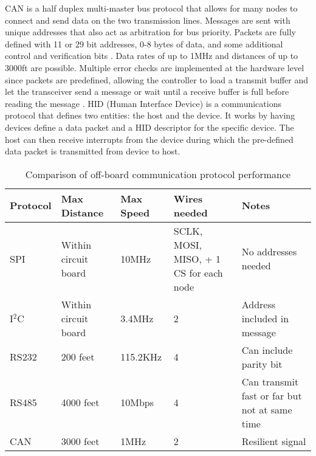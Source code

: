 \newline
CAN is a half duplex multi-master bus protocol that allows for many nodes to connect and send data on the two transmission lines. Messages are sent with unique addresses that also act as arbitration for bus priority. Packets are fully defined with 11 or 29 bit addresses, 0-8 bytes of data, and some additional control and verification bits \cite{CAN_Guide,CAN_Requirements}. Data rates of up to 1MHz and distances of up to 3000ft are possible. Multiple error checks are implemented at the hardware level since packets are predefined, allowing the controller to load a transmit buffer and let the transceiver send a message or wait until a receive buffer is full before reading the message \cite{CANvSPI}. 
\newline
HID (Human Interface Device) is a communications protocol that defines two entities: the host and the device.  It works by having devices define a data packet and a HID descriptor for the specific device. The host can then receive interrupts from the device during which the pre-defined data packet is transmitted from device to host.  

\begin{table}[H]
	\begin{center}
		\begin{tabular} {| l | l | p{2cm} | p{2.5cm} | p{2.5cm} |}
			\hline
			Protocol & Max Distance & Max Speed & Wires needed & Notes \\ \hline
			SPI & Within circuit board & 10MHz & SCLK, MOSI, MISO, + 1 CS for each node & No addresses needed
			\\ \hline
			I$^2$C & Within circuit board & 3.4MHz & 2 & Address included in message
			\\ \hline
			RS232 & 200 feet & 115.2KHz & 4 & Can include parity bit
			\\ \hline
			RS485 & 4000 feet & 10Mbps & 4 & Can transmit fast or far but not at same time
			\\ \hline
			CAN & 3000 feet & 1MHz & 2 & Resilient signal
			\\ \hline
		\end{tabular}
	\end{center}
	\caption{Comparison of off-board communication protocol performance}
	\label{tbl:Comm_Compare}
\end{table}


